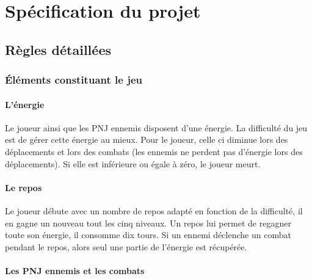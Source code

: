 \documentclass[11pt]{article}
\begin{document}


\section{Spécification du projet}

\subsection{Règles détaillées}

\subsubsection{Éléments constituant le jeu}

\paragraph{L’énergie}

Le joueur ainsi que les PNJ ennemis disposent d'une énergie. La difficulté du jeu est  de gérer cette énergie au mieux. Pour le joueur, celle ci diminue lors des déplacements et lors des combats (les ennemis ne perdent pas d'énergie lors des déplacements). Si elle est inférieure ou égale à zéro, le joueur meurt.

\paragraph{Le repos}

Le joueur débute avec un nombre de repos adapté en fonction de la difficulté, il en gagne un nouveau tout les cinq niveaux. Un repos lui permet de regagner toute son énergie, il consomme dix tours. Si un ennemi déclenche un combat pendant le repos, alors seul une partie de l'énergie est récupérée.

\paragraph{Les PNJ ennemis et les combats}
\end{document}
